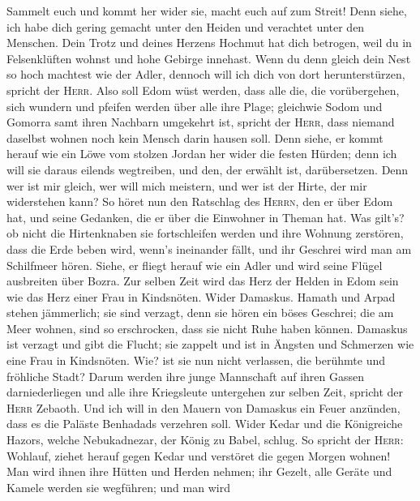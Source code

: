 Sammelt euch und kommt her wider sie, macht euch auf zum Streit!
 Denn siehe, ich habe dich gering gemacht unter den
Heiden und verachtet unter den Menschen.  Dein Trotz und
deines Herzens Hochmut hat dich betrogen, weil du in Felsenklüften
wohnst und hohe Gebirge innehast. Wenn du denn gleich dein Nest so hoch
machtest wie der Adler, dennoch will ich dich von dort herunterstürzen,
spricht der \textsc{Herr}.  Also soll Edom wüst werden,
dass alle die, die vorübergehen, sich wundern und pfeifen werden über
alle ihre Plage;  gleichwie Sodom und Gomorra samt ihren
Nachbarn umgekehrt ist, spricht der \textsc{Herr}, dass niemand daselbst
wohnen noch kein Mensch darin hausen soll.  Denn siehe,
er kommt herauf wie ein Löwe vom stolzen Jordan her wider die festen
Hürden; denn ich will sie daraus eilends wegtreiben, und den, der
erwählt ist, darübersetzen. Denn wer ist mir gleich, wer will mich
meistern, und wer ist der Hirte, der mir widerstehen kann?
 So höret nun den Ratschlag des \textsc{Herrn}, den er
über Edom hat, und seine Gedanken, die er über die Einwohner in Theman
hat. Was gilt's? ob nicht die Hirtenknaben sie fortschleifen werden und
ihre Wohnung zerstören,  dass die Erde beben wird, wenn's
ineinander fällt, und ihr Geschrei wird man am Schilfmeer hören.
 Siehe, er fliegt herauf wie ein Adler und wird seine
Flügel ausbreiten über Bozra. Zur selben Zeit wird das Herz der Helden
in Edom sein wie das Herz einer Frau in Kindsnöten. 
Wider Damaskus. Hamath und Arpad stehen jämmerlich; sie sind verzagt,
denn sie hören ein böses Geschrei; die am Meer wohnen, sind so
erschrocken, dass sie nicht Ruhe haben können.  Damaskus
ist verzagt und gibt die Flucht; sie zappelt und ist in Ängsten und
Schmerzen wie eine Frau in Kindsnöten.  Wie? ist sie nun
nicht verlassen, die berühmte und fröhliche Stadt?  Darum
werden ihre junge Mannschaft auf ihren Gassen darniederliegen und alle
ihre Kriegsleute untergehen zur selben Zeit, spricht der \textsc{Herr}
Zebaoth.  Und ich will in den Mauern von Damaskus ein
Feuer anzünden, dass es die Paläste Benhadads verzehren soll.
 Wider Kedar und die Königreiche Hazors, welche
Nebukadnezar, der König zu Babel, schlug. So spricht der \textsc{Herr}:
Wohlauf, ziehet herauf gegen Kedar und verstöret die gegen Morgen
wohnen!  Man wird ihnen ihre Hütten und Herden nehmen;
ihr Gezelt, alle Geräte und Kamele werden sie wegführen; und man wird

